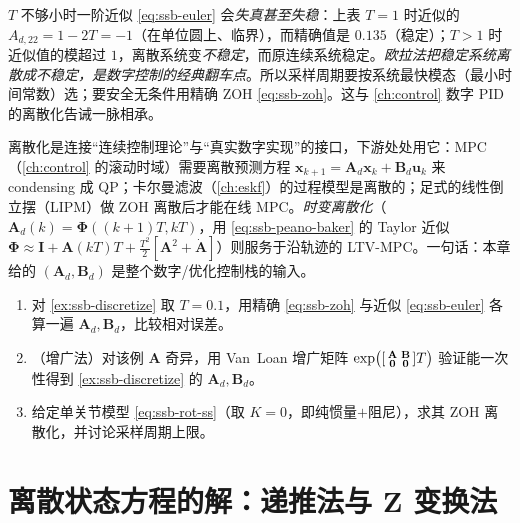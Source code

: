 \begin{pitfall}
$T$ 不够小时一阶近似 \cref{eq:ssb-euler} 会\emph{失真甚至失稳}：上表 $T=1$ 时近似的 $A_{d,22}=1-2T=-1$（在单位圆上、临界），而精确值是 $0.135$（稳定）；$T>1$ 时近似值的模超过 $1$，离散系统变\emph{不稳定}，而原连续系统稳定。\emph{欧拉法把稳定系统离散成不稳定，是数字控制的经典翻车点}。所以采样周期要按系统最快模态（最小时间常数）选；要安全无条件用精确 ZOH \cref{eq:ssb-zoh}。这与 \cref{ch:control} 数字 PID 的离散化告诫一脉相承。
\end{pitfall}

\begin{insight}
离散化是连接“连续控制理论”与“真实数字实现”的接口，下游处处用它：MPC（\cref{ch:control} 的滚动时域）需要离散预测方程 $\mathbf{x}_{k+1}=\mathbf{A}_d\mathbf{x}_k+\mathbf{B}_d\mathbf{u}_k$ 来 condensing 成 QP；卡尔曼滤波（\cref{ch:eskf}）的过程模型是离散的；足式的线性倒立摆（LIPM）做 ZOH 离散后才能在线 MPC。\emph{时变离散化}（$\mathbf{A}_d(k)=\boldsymbol{\Phi}((k{+}1)T,kT)$，用 \cref{eq:ssb-peano-baker} 的 Taylor 近似 $\boldsymbol{\Phi}\approx\mathbf{I}+\mathbf{A}(kT)T+\tfrac{T^2}{2}[\mathbf{A}^2+\dot{\mathbf{A}}]$）则服务于沿轨迹的 LTV-MPC。一句话：本章给的 $(\mathbf{A}_d,\mathbf{B}_d)$ 是整个数字/优化控制栈的输入。
\end{insight}

\begin{practice}
\begin{enumerate}
  \item 对 \cref{ex:ssb-discretize} 取 $T=0.1$，用精确 \cref{eq:ssb-zoh} 与近似 \cref{eq:ssb-euler} 各算一遍 $\mathbf{A}_d,\mathbf{B}_d$，比较相对误差。
  \item （增广法）对该例 $\mathbf{A}$ 奇异，用 Van~Loan 增广矩阵 $\exp\!\big(\begin{bsmallmatrix}\mathbf{A}&\mathbf{B}\\\mathbf{0}&\mathbf{0}\end{bsmallmatrix}T\big)$ 验证能一次性得到 \cref{ex:ssb-discretize} 的 $\mathbf{A}_d,\mathbf{B}_d$。
  \item 给定单关节模型 \cref{eq:ssb-rot-ss}（取 $K=0$，即纯惯量$+$阻尼），求其 ZOH 离散化，并讨论采样周期上限。
\end{enumerate}
\end{practice}

\section{离散状态方程的解：递推法与 Z 变换法}
\label{sec:ssb-discrete-sol}

